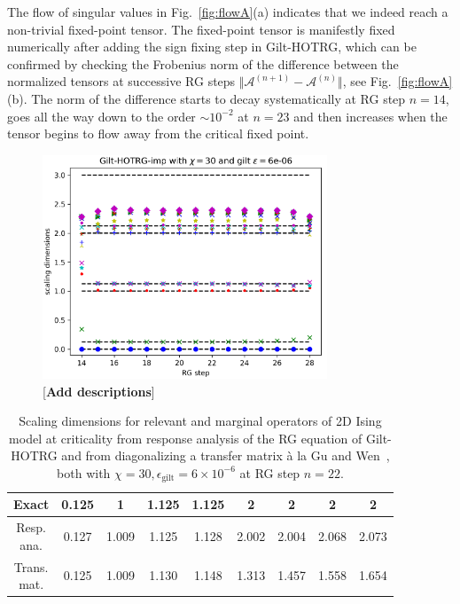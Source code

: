 \documentclass[aps,prb,reprint,superscriptaddress]{revtex4-2}
\begin{document}
%
The flow of singular values in Fig.~\ref{fig:flowA}(a) indicates that we
indeed reach a non-trivial fixed-point tensor. The fixed-point tensor is
manifestly fixed numerically after adding the sign fixing step in
Gilt-HOTRG, which can be confirmed by checking the Frobenius norm of the
difference between the normalized tensors at successive RG steps $\Vert
\mathcal{A}^{(n+1)} - \mathcal{A}^{(n)}\Vert$, see
Fig.~\ref{fig:flowA}(b). The norm of the difference starts to decay
systematically at RG step $n = 14$, goes all the way down to the order
$\sim 10^{-2}$ at $n = 23$ and then increases when the tensor begins to
flow away from the critical fixed point.
\begin{figure}[htb]
    \includegraphics[width=8.5cm]{./figs/scDim}
    \caption{\label{fig:scDim}[\textbf{Add descriptions}]}
\end{figure}
%
\begin{table}[h]%
\caption{Scaling dimensions for relevant and marginal operators of 2D
Ising model at criticality from response analysis of the RG equation
of Gilt-HOTRG and from diagonalizing a
transfer matrix \`a la Gu and Wen~\cite{GuWen2009}, both with $\chi =
30, \epsilon_{\text{gilt}} = 6\times 10^{-6}$ at RG step $n =
22$.\label{table:scDim}} 
\begin{ruledtabular}
\begin{tabular}{ c c c c c c c c c }
Exact      & 0.125 & 1 & 1.125 & 1.125 & 2 & 2 & 2 & 2 \\
\hline
\thead{Resp.\\ ana.} & 0.127 & 1.009 & 1.125 & 1.128 & 2.002 &
2.004 & 2.068 & 2.073 \\
\thead{Trans.\\ mat.} & 0.125 & 1.009 & 1.130 & 1.148 & 1.313 &
1.457 & 1.558 & 1.654
\end{tabular}
\end{ruledtabular}
\end{table}
%
\end{document}
